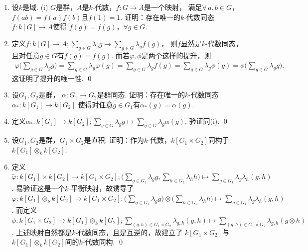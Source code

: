 \begin{enumerate}
\item[9.5] 设$k$是域. (i) $G$是群，$A$是$k$-代数，$f:G \rightarrow A$是一个映射，
        满足$\forall \, a,b \in G$，$f(ab)=f(a)f(b)$且$f(1)=1$. 
        证明：存在唯一的$k$-代数同态$\tilde{f}:k[G] \rightarrow A$使得
        $\tilde{f}(g)=f(g)$，$\forall g \in G$.
\item[\textbf{证明:}]
    定义$\tilde{f}:k[G] \rightarrow A;
    \sum\limits_{g \in G}\lambda_{g}g \mapsto 
    \sum\limits_{g \in G}\lambda_{g}f(g)$，
    则$\tilde{f}$显然是$k$-代数同态，
    且对任意$g \in G$有$\tilde{f}(g)=f(g)$.
    而若$\varphi,\phi$是两个这样的提升，则
    \begin{equation*}\begin{aligned}
        \varphi\Big(\sum_{g \in G}\lambda_{g}g\Big) 
        = \sum_{g \in G}\lambda_{g}\varphi(g)
        = \sum_{g \in G}\lambda_{g}f(g)
        = \sum_{g \in G}\lambda_{g}\phi(g) 
        = \phi\Big(\sum_{g \in G}\lambda_{g}g\Big).
    \end{aligned}\end{equation*}
        这证明了提升的唯一性. \qed
    \item[(ii)] 设$G_{1},G_{2}$是群，
        $\alpha:G_{1} \rightarrow G_{2}$是群同态.
        证明：存在唯一的$k$-代数同态
        $\alpha_{*}:k[G_{1}] \rightarrow k[G_{2}]$
        使得对任意$g \in G_1$有$\alpha_{*}(g)=\alpha(g)$.
        \item[\textbf{证明:}]
        定义$\alpha_{*}:k[G_{1}] \rightarrow k[G_{2}];
        \sum\limits_{g \in G}\lambda_{g}g \mapsto \sum\limits_{g \in G}\lambda_{g}\alpha(g)$.
        验证同(i). \qed
    \item[(iii)] 设$G_{1},G_{2}$是群，$G_{1} \times G_{2}$是直积.
        证明：作为$k$-代数，$k[G_{1} \times G_{2}]$同构于$k[G_{1}] \otimes_k k[G_{2}]$.
    \item[\textbf{证明:}]
        定义$\widetilde{\varphi}:k[G_{1}] \times k[G_{2}] \rightarrow k[G_{1} \times G_{2}];
        \Big(\sum\limits_{g \in G_{1}}\lambda_{g}g,\sum\limits_{h \in G_{2}}\lambda_{h}h\Big)
        \mapsto \sum\limits_{g \in G_{1}}\lambda_{g}\lambda_{h}(g,h)$. 
        易验证这是一个$k$-平衡映射，故诱导了
        $\varphi:k[G_{1}] \otimes_k k[G_{2}] \rightarrow k[G_{1} \times G_{2}];
        \Big(\sum\limits_{g \in G_{1}}\lambda_{g}g\Big) \otimes 
        \Big(\sum\limits_{h \in G_{2}}\lambda_{h}h\Big) 
        \mapsto \sum\limits_{g \in G_{1}}\lambda_{g}\lambda_{h}(g,h)$.
        而定义$\phi:k[G_{1} \times G_{2}] \rightarrow k[G_{1}] \otimes_k k[G_{2}];
        \sum\limits_{(g,h) \in G_{1} \times G_{2}} \lambda_{g,h}(g,h)
        \mapsto \sum\limits_{(g,h) \in G_{1} \times G_{2}}\lambda_{g,h}(g \otimes h)$.
        上述映射自然都是$k$-代数同态，且是互逆的，故建立了
        $k[G_{1} \times G_{2}]$与$k[G_{1}] \otimes_k k[G_{2}]$间的$k$-代数同构. \qed
        

\end{enumerate}
